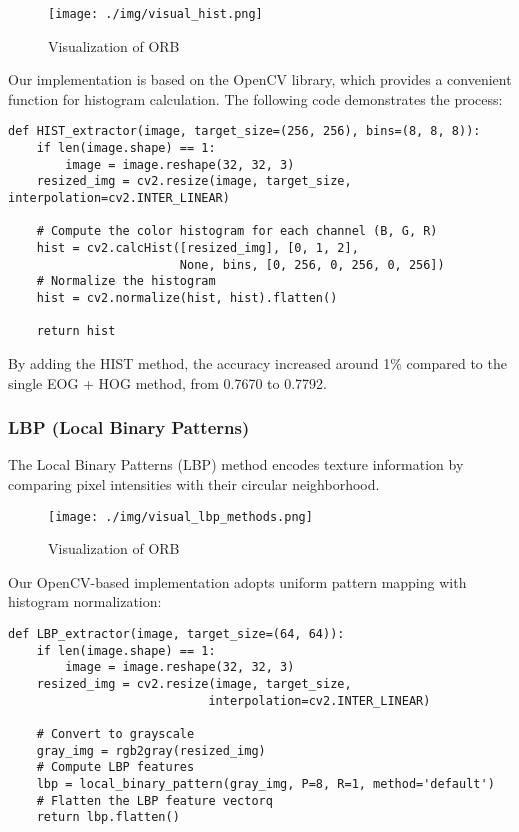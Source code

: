 \documentclass[a4paper,11pt]{article}
\begin{document}
\begin{figure}[H]
    \centering
    \texttt{[image: ./img/visual\_hist.png]}
    \caption[visual_hog] {Visualization of ORB}
\end{figure}

Our implementation is based on the OpenCV library, which provides a convenient function for histogram calculation. The following code demonstrates the process:

\begin{verbatim}
def HIST_extractor(image, target_size=(256, 256), bins=(8, 8, 8)):
    if len(image.shape) == 1:
        image = image.reshape(32, 32, 3)
    resized_img = cv2.resize(image, target_size, interpolation=cv2.INTER_LINEAR)
    
    # Compute the color histogram for each channel (B, G, R)
    hist = cv2.calcHist([resized_img], [0, 1, 2], 
                        None, bins, [0, 256, 0, 256, 0, 256])
    # Normalize the histogram
    hist = cv2.normalize(hist, hist).flatten()

    return hist
\end{verbatim}

By adding the HIST method, the accuracy increased around 1\% compared to the single EOG + HOG method, from 0.7670 to 0.7792.

\subsubsection{LBP (Local Binary Patterns)}

The Local Binary Patterns (LBP) method encodes texture information by comparing pixel intensities with their circular neighborhood.

\begin{figure}[H]
    \centering
    \texttt{[image: ./img/visual\_lbp\_methods.png]}
    \caption[visual_hog] {Visualization of ORB}
\end{figure}

Our OpenCV-based implementation adopts uniform pattern mapping with histogram normalization:

\begin{verbatim}
def LBP_extractor(image, target_size=(64, 64)):
    if len(image.shape) == 1:
        image = image.reshape(32, 32, 3)
    resized_img = cv2.resize(image, target_size, 
                            interpolation=cv2.INTER_LINEAR)

    # Convert to grayscale
    gray_img = rgb2gray(resized_img)
    # Compute LBP features
    lbp = local_binary_pattern(gray_img, P=8, R=1, method='default')
    # Flatten the LBP feature vectorq
    return lbp.flatten()
\end{verbatim}
\end{document}
